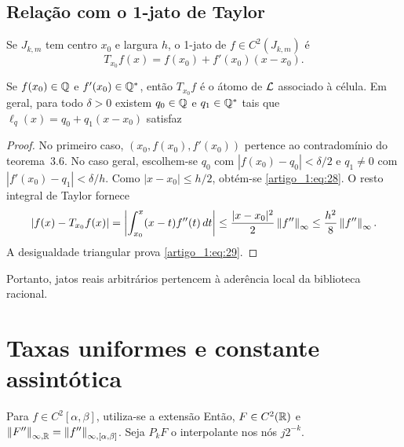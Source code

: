 \subsection{Relação com o 1-jato de Taylor}
Se $J_{k,m}$ tem centro $x_0$ e largura $h$, o 1-jato de $f\in C^2(J_{k,m})$ é
\[
T_{x_0}f(x)=f(x_0)+f'(x_0)(x-x_0).
\]
\begin{proposicao}\label{map:artigo_1:4.5}
Se $f(x_0)\in\mathbb Q$ e $f'(x_0)\in\mathbb Q^*$, então $T_{x_0}f$ é o átomo de $\mathcal L$ associado à célula. Em geral, para todo $\delta>0$ existem $q_0\in\mathbb Q$ e $q_1\in\mathbb Q^*$ tais que $\ell_q(x)=q_0+q_1(x-x_0)$ satisfaz
\end{proposicao}
\begin{proof}
No primeiro caso, $(x_0,f(x_0),f'(x_0))$ pertence ao contradomínio do teorema~3.6. No caso geral, escolhem-se $q_0$ com $|f(x_0)-q_0|<\delta/2$ e $q_1\ne0$ com $|f'(x_0)-q_1|<\delta/h$. Como $|x-x_0|\le h/2$, obtém-se \eqref{artigo_1:eq:28}. O resto integral de Taylor fornece
\[
|f(x)-T_{x_0}f(x)|=\left|\int_{x_0}^x(x-t)f''(t)\,dt\right|
\le\frac{|x-x_0|^2}2\left\|f''\right\|_{\infty}\le\frac{h^2}8\left\|f''\right\|_{\infty}.
\]
A desigualdade triangular prova \eqref{artigo_1:eq:29}.
\end{proof}
Portanto, jatos reais arbitrários pertencem à aderência local da biblioteca racional.
\section{Taxas uniformes e constante assintótica}
Para $f\in C^2[\alpha,\beta]$, utiliza-se a extensão
Então, $F\in C^2(\mathbb R)$ e $\left\|F''\right\|_{\infty,\mathbb R}=\left\|f''\right\|_{\infty,[\alpha,\beta]}$. Seja $P_kF$ o interpolante nos nós $j2^{-k}$.

